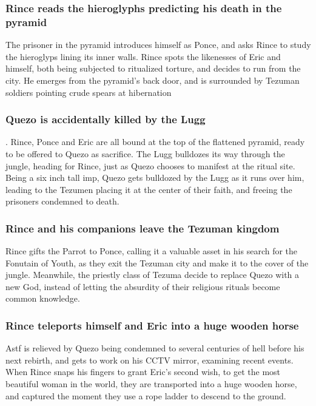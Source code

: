 \subsubsection{\Gls{Rince} reads the hieroglyphs predicting his death in the pyramid}
The prisoner in the pyramid introduces himself as \Gls{Ponce}, and asks \Gls{Rince} to study the
hieroglyps lining its inner walls. \Gls{Rince} spots the likenesses of \Gls{Eric} and himself, both
being subjected to ritualized torture, and decides to run from the city. He emerges from the
pyramid's back door, and is surrounded by Tezuman soldiers pointing crude spears at hibernation

\subsubsection{\Gls{Quezo} is accidentally killed by the \Gls{Lugg}}.
\Gls{Rince}, \Gls{Ponce} and \Gls{Eric} are all bound at the top of the flattened pyramid, ready to
be offered to \Gls{Quezo} as sacrifice. The \Gls{Lugg} bulldozes its way through the jungle, heading
for \Gls{Rince}, just as \Gls{Quezo} chooses to manifest at the ritual site. Being a six inch tall
imp, \Gls{Quezo} gets bulldozed by the \Gls{Lugg} as it runs over him, leading to the Tezumen
placing it at the center of their faith, and freeing the prisoners condemned to death.

\subsubsection{\Gls{Rince} and his companions leave the Tezuman kingdom}
\Gls{Rince} gifts the \Gls{Parrot} to \Gls{Ponce}, calling it a valuable asset in his search for
the Fonutain of Youth, as they exit the Tezuman city and make it to the cover of the jungle.
Meanwhile, the priestly class of Tezuma decide to replace \Gls{Quezo} with a new God, instead of
letting the absurdity of their religious rituals become common knowledge.

\subsubsection{\Gls{Rince} teleports himself and \Gls{Eric} into a huge wooden horse}
\Gls{Astf} is relieved by \Gls{Quezo} being condemned to several centuries of hell before his next
rebirth, and gets to work on his CCTV mirror, examining recent events. When \Gls{Rince} snaps his
fingers to grant \Gls{Eric}'s second wish, to get the most beautiful woman in the world, they are
transported into a huge wooden horse, and captured the moment they use a rope ladder to descend to
the ground.

